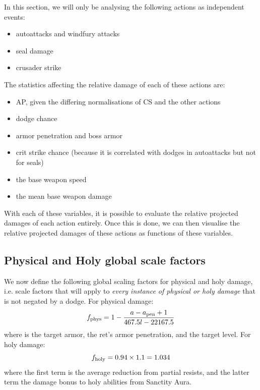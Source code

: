In this section, we will only be analysing the following actions as independent events:
\begin{itemize}
	\item autoattacks and windfury attacks
	\item seal damage
	\item crusader strike
\end{itemize}
The statistics affecting the relative damage of each of these actions are:
\begin{itemize}
	\item AP, given the differing normalisations of CS and the other actions
	\item dodge chance
	\item armor penetration and boss armor
	\item crit strike chance (because it is correlated with dodges in autoattacks but not for seals)
	\item the base weapon speed
	\item the mean base weapon damage
\end{itemize}
With each of these variables, it is possible to evaluate the relative projected damages of each action entirely.
Once this is done, we can then visualise the relative projected damages of these actions as functions of these variables.

\subsection{Physical and Holy global scale factors}

We now define the following global scaling factors for physical and holy damage, i.e. scale factors that will apply to \emph{every instance of physical or holy damage} that is not negated by a dodge.
For physical damage:
\begin{equation}
	f_{\mathrm{phys}}  = 1 - \frac{a - a_\mathrm{pen} + 1}{467.5 l -22167.5}
\end{equation}
where \armor is the target armor, \armpen the ret's armor penetration, and \lvl the target level.
\noindent
For holy damage:
\begin{equation}
	f_{\mathrm{holy}}  = 0.94 \times 1.1 = 1.034
\end{equation}
where the first term is the average reduction from partial resists, and the latter term the damage bonus to holy abilities from Sanctity Aura.

